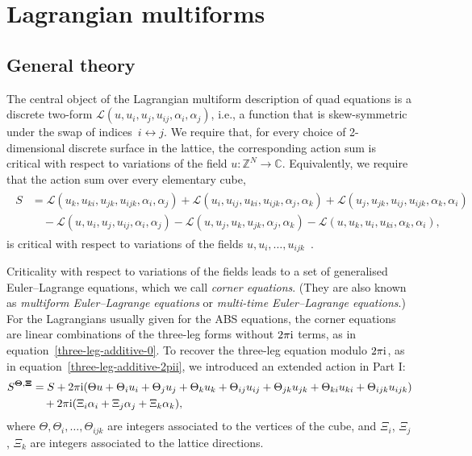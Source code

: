 \documentclass[10pt,a4paper]{amsart}
\newcommand{\C}{\mathbb{C}}
\newcommand{\Z}{\mathbb{Z}}
\newcommand{\cL}{\mathcal{L}}
\renewcommand{\vec}{\boldsymbol}
\numberwithin{equation}{section}
\begin{document}
\section{Lagrangian multiforms}
\label{sec-multiforms}

\subsection{General theory}

The central object of the Lagrangian multiform description of quad equations is a discrete two-form $\cL(u,u_i,u_j,u_{ij},\alpha_i,\alpha_j)$, i.e., a function that is skew-symmetric under the swap of indices~${i \leftrightarrow j}$. We require that, for every choice of 2-dimensional discrete surface in the lattice, the corresponding action sum is critical with respect to variations of the field $u\colon \Z^N \to \C$. Equivalently, we require that the action sum over every elementary cube,{\samepage
\begin{align*}
\begin{split}
 S &= \cL(u_k,u_{ki},u_{jk}, u_{ijk},\alpha_i,\alpha_j) + \cL(u_i,u_{ij},u_{ki}, u_{ijk},\alpha_j,\alpha_k) + \cL(u_j,u_{jk},u_{ij}, u_{ijk},\alpha_k,\alpha_i)
 \\ &\quad{} - \cL(u,u_i,u_j,u_{ij},\alpha_i,\alpha_j) - \cL(u,u_j,u_k,u_{jk},\alpha_j,\alpha_k) - \cL(u,u_k,u_i,u_{ki},\alpha_k,\alpha_i) ,
\end{split}
\end{align*}
is critical with respect to variations of the fields $u, u_i, \dots, u_{ijk}$~\cite{boll2014integrability}.}

Criticality with respect to variations of the fields leads to a set of generalised Euler--Lagrange equations, which we call \emph{corner equations}. (They are also known as \emph{multiform Euler--Lagrange equations} or \emph{multi-time Euler--Lagrange equations}.) For the Lagrangians usually given for the ABS equations, the corner equations are linear combinations of the three-leg forms without $2\pi {\rm i}$ terms, as in equation~\eqref{three-leg-additive-0}. To recover the three-leg equation modulo $2 \pi {\rm i}$, as in equation~\eqref{three-leg-additive-2pii}, we introduced an extended action in Part I:
\begin{align*}
 S^{\vec \Theta,\vec \Xi} &=
 S + 2 \pi {\rm i} ( \Theta u + \Theta_i u_i + \Theta_j u_j + \Theta_k u_k +\Theta_{ij} u_{ij} + \Theta_{jk} u_{jk} + \Theta_{ki} u_{ki} + \Theta_{ijk} u_{ijk}) \\
 &\quad{} + 2 \pi {\rm i} (\Xi_i \alpha_i + \Xi_j \alpha_j + \Xi_k \alpha_k),
\end{align*}
where $\Theta, \Theta_i, \dots, \Theta_{ijk}$ are integers associated to the vertices of the cube, and $\Xi_i$, $\Xi_j$, $\Xi_k$ are integers associated to the lattice directions.
\end{document}
